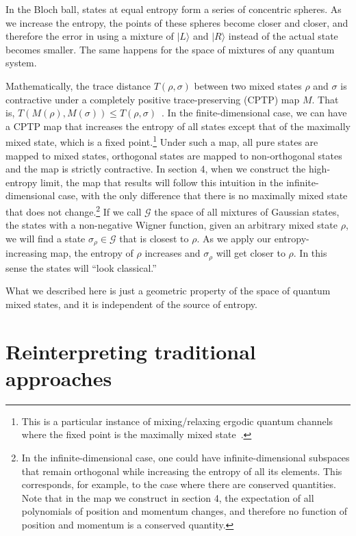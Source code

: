 \documentclass{article}
\def\>{\rangle}
\begin{document}
In the Bloch ball, states at equal entropy form a series of concentric spheres. As we increase the entropy, the points of these spheres become closer and closer, and therefore the error in using a mixture of $|L\>$ and $|R\>$ instead of the actual state becomes smaller. The same happens for the space of mixtures of any quantum system.

Mathematically, the trace distance $T(\rho,\sigma)$ between two mixed states $\rho$ and $\sigma$ is contractive under a completely positive trace-preserving (CPTP) map $M$. That is, $T(M(\rho),M(\sigma)) \leq T(\rho,\sigma)$~\cite{nielsen2010quantum}. In the finite-dimensional case, we can have a CPTP map that increases the entropy of all states except that of the maximally mixed state, which is a fixed point.\footnote{This is a particular instance of mixing/relaxing ergodic quantum channels where the fixed point is the maximally mixed state~\cite{Burgarth2012ErgodicAM}.}  Under such a map, all pure states are mapped to mixed states, orthogonal states are mapped to non-orthogonal states and the map is strictly contractive. In section 4, when we construct the high-entropy limit, the map that results will follow this intuition in the infinite-dimensional case, with the only difference that there is no maximally mixed state that does not change.\footnote{In the infinite-dimensional case, one could have infinite-dimensional subspaces that remain orthogonal while increasing the entropy of all its elements. This corresponds, for example, to the case where there are conserved quantities. Note that in the map we construct in section 4, the expectation of all polynomials of position and momentum changes, and therefore no function of position and momentum is a conserved quantity. }  If we call $\mathcal{G}$ the space of all mixtures of Gaussian states, the states with a non-negative Wigner function, given an arbitrary mixed state $\rho$, we will find a state $\sigma_{\rho} \in \mathcal{G}$ that is closest to $\rho$. As we apply our entropy-increasing map, the entropy of $\rho$ increases and $\sigma_{\rho}$ will get closer to $\rho$. In this sense the states will ``look classical.''

What we described here is just a geometric property of the space of quantum mixed states, and it is independent of the source of entropy.

\section{Reinterpreting traditional approaches}
\end{document}
